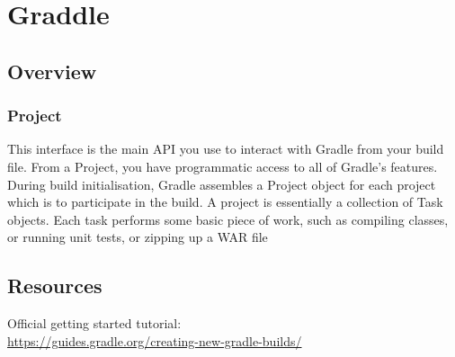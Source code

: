\documentclass{report}
\begin{document}
\part{Graddle}



\chapter{Overview}

\section{Project}
This interface is the main API you use to interact with Gradle
from your build file. From a Project, you have programmatic access 
to all of Gradle's features. During build initialisation, Gradle assembles a
Project object for each project which is to participate in the build.
A project is essentially a collection of Task objects. Each task performs some
basic piece of work, such as compiling classes, or running unit tests, or zipping up a WAR file



\chapter{Resources}
Official getting started tutorial:\\
\url{https://guides.gradle.org/creating-new-gradle-builds/}
\end{document}
